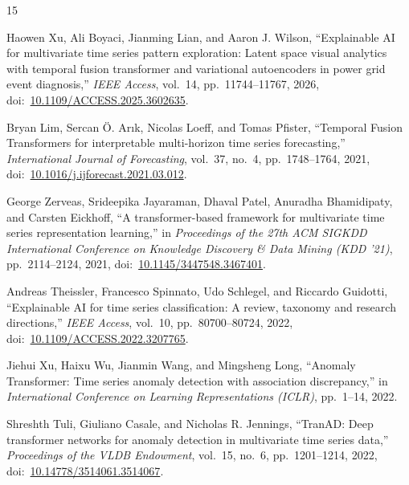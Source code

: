 \documentclass[12pt,a4paper]{report}
\begin{document}
\begin{thebibliography}{15}
\sloppy

Haowen Xu, Ali Boyaci, Jianming Lian, and Aaron J. Wilson, ``Explainable AI for multivariate time series pattern exploration: Latent space visual analytics with temporal fusion transformer and variational autoencoders in power grid event diagnosis,'' \textit{IEEE Access}, vol.~14, pp.~11744--11767, 2026, doi:~\href{https://doi.org/10.1109/ACCESS.2025.3602635}{10.1109/ACCESS.2025.3602635}.

Bryan Lim, Sercan \"{O}. Ar\i k, Nicolas Loeff, and Tomas Pfister, ``Temporal Fusion Transformers for interpretable multi-horizon time series forecasting,'' \textit{International Journal of Forecasting}, vol.~37, no.~4, pp.~1748--1764, 2021, doi:~\href{https://doi.org/10.1016/j.ijforecast.2021.03.012}{10.1016/j.ijforecast.2021.03.012}.

George Zerveas, Srideepika Jayaraman, Dhaval Patel, Anuradha Bhamidipaty, and Carsten Eickhoff, ``A transformer-based framework for multivariate time series representation learning,'' in \textit{Proceedings of the 27th ACM SIGKDD International Conference on Knowledge Discovery \& Data Mining (KDD '21)}, pp.~2114--2124, 2021, doi:~\href{https://doi.org/10.1145/3447548.3467401}{10.1145/3447548.3467401}.

Andreas Theissler, Francesco Spinnato, Udo Schlegel, and Riccardo Guidotti, ``Explainable AI for time series classification: A review, taxonomy and research directions,'' \textit{IEEE Access}, vol.~10, pp.~80700--80724, 2022, doi:~\href{https://doi.org/10.1109/ACCESS.2022.3207765}{10.1109/ACCESS.2022.3207765}.

Jiehui Xu, Haixu Wu, Jianmin Wang, and Mingsheng Long, ``Anomaly Transformer: Time series anomaly detection with association discrepancy,'' in \textit{International Conference on Learning Representations (ICLR)}, pp.~1--14, 2022.

Shreshth Tuli, Giuliano Casale, and Nicholas R. Jennings, ``TranAD: Deep transformer networks for anomaly detection in multivariate time series data,'' \textit{Proceedings of the VLDB Endowment}, vol.~15, no.~6, pp.~1201--1214, 2022, doi:~\href{https://doi.org/10.14778/3514061.3514067}{10.14778/3514061.3514067}.


\end{thebibliography}
\end{document}
